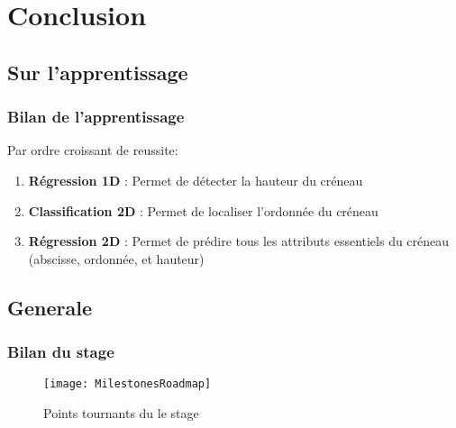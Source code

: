 
% 



\section{Conclusion}

\subsection{Sur l'apprentissage}
\begin{frame}
    \frametitle{Bilan de l'apprentissage}
    Par ordre croissant de reussite:
    \begin{enumerate}
        \item \textbf{Régression 1D} : Permet de détecter la hauteur du créneau %
        \item \textbf{Classification 2D} : Permet de localiser l'ordonnée du créneau %
        \item \textbf{Régression 2D} : Permet de prédire tous les attributs essentiels du créneau (abscisse, ordonnée, et hauteur)%
      \end{enumerate}
\end{frame}

\subsection{Generale}
\begin{frame}
    \frametitle{Bilan du stage}
    \begin{figure}
        \texttt{[image: MilestonesRoadmap]}       
        \caption{Points tournants du le stage}
    \end{figure}
\end{frame}

